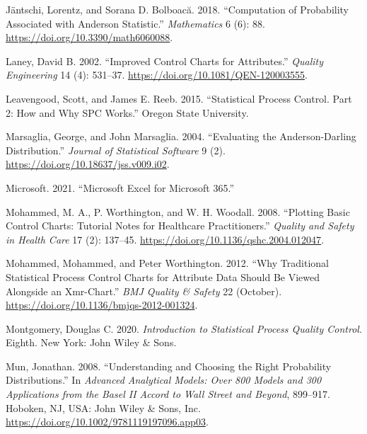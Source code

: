 \documentclass[
]{book}
\newlength{\cslhangindent}
\newenvironment{CSLReferences}[2] %
 {%
  \setlength{\parindent}{0pt}
  \ifodd #1 \everypar{\setlength{\hangindent}{\cslhangindent}}\ignorespaces\fi
  \ifnum #2 > 0
  \setlength{\parskip}{#2\baselineskip}
  \fi
 }%
 {}
\begin{document}
\begin{CSLReferences}{1}{0}
\leavevmode{}%
Jäntschi, Lorentz, and Sorana D. Bolboacă. 2018. {``Computation of Probability Associated with {Anderson} Statistic.''} \emph{Mathematics} 6 (6): 88. \url{https://doi.org/10.3390/math6060088}.

\leavevmode{}%
Laney, David B. 2002. {``Improved Control Charts for Attributes.''} \emph{Quality Engineering} 14 (4): 531--37. \url{https://doi.org/10.1081/QEN-120003555}.

\leavevmode{}%
Leavengood, Scott, and James E. Reeb. 2015. {``Statistical Process Control. {Part} 2: How and Why {SPC} Works.''} {Oregon State University}.

\leavevmode{}%
Marsaglia, George, and John Marsaglia. 2004. {``Evaluating the Anderson-Darling Distribution.''} \emph{Journal of Statistical Software} 9 (2). \url{https://doi.org/10.18637/jss.v009.i02}.

\leavevmode{}%
Microsoft. 2021. {``Microsoft Excel for Microsoft 365.''}

\leavevmode{}%
Mohammed, M. A., P. Worthington, and W. H. Woodall. 2008. {``Plotting Basic Control Charts: Tutorial Notes for Healthcare Practitioners.''} \emph{Quality and Safety in Health Care} 17 (2): 137--45. \url{https://doi.org/10.1136/qshc.2004.012047}.

\leavevmode{}%
Mohammed, Mohammed, and Peter Worthington. 2012. {``Why Traditional Statistical Process Control Charts for Attribute Data Should Be Viewed Alongside an Xmr-Chart.''} \emph{BMJ Quality \& Safety} 22 (October). \url{https://doi.org/10.1136/bmjqs-2012-001324}.

\leavevmode{}%
Montgomery, Douglas C. 2020. \emph{Introduction to Statistical Process Quality Control}. Eighth. {New York}: {John Wiley \& Sons}.

\leavevmode{}%
Mun, Jonathan. 2008. {``Understanding and Choosing the Right Probability Distributions.''} In \emph{Advanced Analytical Models: Over 800 Models and 300 Applications from the Basel {II} Accord to Wall Street and Beyond}, 899--917. {Hoboken, NJ, USA}: {John Wiley \& Sons, Inc.} \url{https://doi.org/10.1002/9781119197096.app03}.


\end{CSLReferences}
\end{document}
